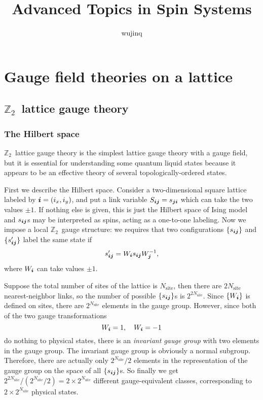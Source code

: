 \documentclass[hyperref, a4paper]{article}
\title{Advanced Topics in Spin Systems}
\author{wujinq}
\newcommand*{\Ztwo}{$\mathbb{Z}_2$\ }
\begin{document}
\maketitle

\section{Gauge field theories on a lattice}

\subsection{\Ztwo lattice gauge theory}

\subsubsection{The Hilbert space}

\Ztwo lattice gauge theory is the simplest lattice gauge theory with a gauge field, but it is essential for understanding some quantum liquid states because it appears to be an effective theory of several topologically-ordered states.

First we describe the Hilbert space.
Consider a two-dimensional square lattice labeled by $\vb*{i}=(i_x, i_y)$, and put a link variable $S_{\vb*{i} \vb*{j}} = s_{\vb*{j} \vb*{i}}$ which can take the two values $\pm 1$.
If nothing else is given, this is just the Hilbert space of Ising model and $s_{\vb*{i} \vb*{j}}$s may be interpreted as spins, acting as a one-to-one labeling.
Now we impose a local \Ztwo gauge structure: we requires that two configurations $\{s_{\vb*{i} \vb*{j}}\}$ and $\{s'_{\vb*{i} \vb*{j}}\}$ label the same state if 
\begin{equation}
    s'_{\vb*{i} \vb*{j}} = W_{\vb*{i}} s_{\vb*{i} \vb*{j}} W_{\vb*{j}}^{-1},
\end{equation}
where $W_{\vb*{i}}$ can take values $\pm 1$. 

Suppose the total number of sites of the lattice is $N_\text{site}$, then there are $2 N_\text{site}$ nearest-neighbor links, so the number of possible $\{s_{\vb*{i} \vb*{j}}\}$s is $2^{2 N_\text{site}}$.
Since $\{W_{\vb*{i}}\}$ is defined on sites, there are $2^{N_\text{site}}$ elements in the gauge group.
However, since both of the two gauge transformations
\[
    W_{\vb*{i}} = 1, \quad W_{\vb*{i}} = -1
\]
do nothing to physical states, there is an \emph{invariant gauge group} with two elements in the gauge group.
The invariant gauge group is obviously a normal subgroup.
Therefore, there are actually only $2^{N_\text{site}}/2$ elements in the representation of the gauge group on the space of all $\{s_{\vb*{i} \vb*{j}}\}$s.
So finally we get $2^{2N_\text{site}} / (2^{N_\text{site}} / 2) = 2 \times 2^{N_\text{site}}$ different gauge-equivalent classes, corresponding to $2 \times 2^{N_\text{site}}$ physical states.
\end{document}
